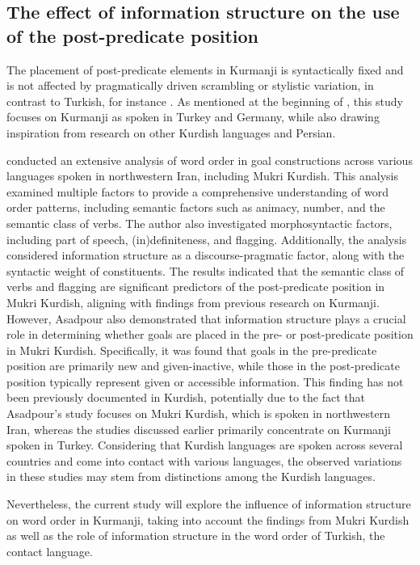 \subsection{The effect of information structure on the use of the post-predicate position}\label{sec:key:3.3.3}

The placement of post-predicate elements in Kurmanji is syntactically fixed and is not affected by pragmatically driven scrambling or stylistic variation, in contrast to Turkish, for instance \citep{Haig2022}. As mentioned at the beginning of , this study focuses on Kurmanji as spoken in Turkey and Germany, while also drawing inspiration from research on other Kurdish languages and Persian.

\citet{Asadpour2021} conducted an extensive analysis of word order in goal constructions across various languages spoken in northwestern Iran, including Mukri Kurdish. This analysis examined multiple factors to provide a comprehensive understanding of word order patterns, including semantic factors such as animacy, number, and the semantic class of verbs. The author also investigated morphosyntactic factors, including part of speech, (in)definiteness, and flagging. Additionally, the analysis considered information structure as a discourse-pragmatic factor, along with the syntactic weight of constituents. The results indicated that the semantic class of verbs and flagging are significant predictors of the post-predicate position in Mukri Kurdish, aligning with findings from previous research on Kurmanji. However, Asadpour also demonstrated that information structure plays a crucial role in determining whether goals are placed in the pre- or post-predicate position in Mukri Kurdish. Specifically, it was found that goals in the pre-predicate position are primarily new and given-inactive, while those in the post-predicate position typically represent given or accessible information. This finding has not been previously documented in Kurdish, potentially due to the fact that Asadpour’s study focuses on Mukri Kurdish, which is spoken in northwestern Iran, whereas the studies discussed earlier primarily concentrate on Kurmanji spoken in Turkey. Considering that Kurdish languages are spoken across several countries and come into contact with various languages, the observed variations in these studies may stem from distinctions among the Kurdish languages.

Nevertheless, the current study will explore the influence of information structure on word order in Kurmanji, taking into account the findings from Mukri Kurdish as well as the role of information structure in the word order of Turkish, the contact language.

